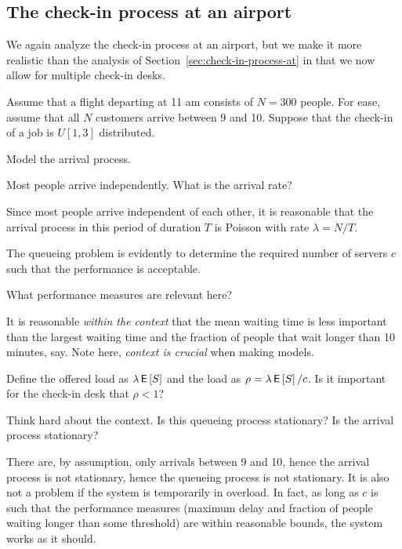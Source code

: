 \subsection{The check-in process at an airport}
\label{sec:check-in-process}

We again analyze the check-in process at an airport, but we make it more realistic than the analysis of Section~\ref{sec:check-in-process-at} in that we now allow for multiple check-in desks.

Assume that a flight departing at 11 am  consists of $N=300$ people.  For ease, assume that all $N$ customers arrive between 9 and 10. Suppose that the check-in of a job is $U[1, 3]$ distributed.  


\begin{exercise}
  Model the arrival process.

  
  \begin{hint}
    Most people arrive independently. What is the arrival rate?
  \end{hint}
  \begin{solution}
Since most people arrive independent of each other, it is reasonable that the arrival process in this period of duration $T$ is Poisson with rate $\lambda = N/T$. 
  \end{solution}
\end{exercise}

The queueing problem  is evidently to determine the required number of servers $c$ such that the performance is acceptable. 

\begin{exercise}
  What performance measures are relevant here?
  \begin{solution}
    It is reasonable \emph{within the context} that the mean waiting time is less important than the largest waiting time and the fraction of people that wait longer than 10 minutes, say.
    Note here, \emph{context is crucial} when making models.
  \end{solution}
\end{exercise}

\begin{exercise}
  Define the offered load as $\lambda \,\mathsf{E}\left[S\right]$ and the load as $\rho = \lambda \,\mathsf{E}\left[S\right]/ c$. Is it important for the check-in desk that $\rho<1$? 

  \begin{hint}
    Think hard about the context. Is this queueing process stationary? Is the arrival process stationary? 
  \end{hint}
  \begin{solution}
    There are, by assumption, only arrivals between 9 and 10, hence the arrival process is not stationary, hence the queueing process is not stationary.  It is also not a problem if the system is temporarily in overload. In fact, as long as $c$ is such that the performance measures (maximum delay and fraction of people waiting longer than some threshold) are within reasonable bounds, the system works as it should.
  \end{solution}
\end{exercise}

